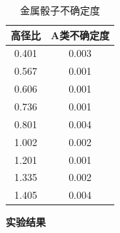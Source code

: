 \documentclass[UTF8]{gapd}
\begin{document}
\begin{table}[h]
	\centering
\begin{tabular}{cc}
  \toprule[1.5pt]
  高径比  & A类不确定度 \\
  \midrule[0.75pt]
  0.401 & 0.003 \\
  0.567 & 0.001 \\
  0.606 & 0.001 \\
  0.736 & 0.001 \\
  0.801 & 0.004 \\
  1.002 & 0.002 \\
  1.201 & 0.001 \\
  1.335 & 0.002 \\
  1.405 & 0.004 \\
  \bottomrule[1.5pt]
\end{tabular}
\caption{金属骰子不确定度}
\end{table}


\textbf{实验结果}
\end{document}
